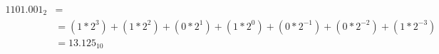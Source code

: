 \begin{align*}
  1101.001_2 &= \\
  &= (1*2^3)+(1*2^2)+(0*2^1)+(1*2^0)+(0*2^{-1})+(0*2^{-2})+(1*2^{-3})\\
  &= 13.125_{10}
\end{align*}
